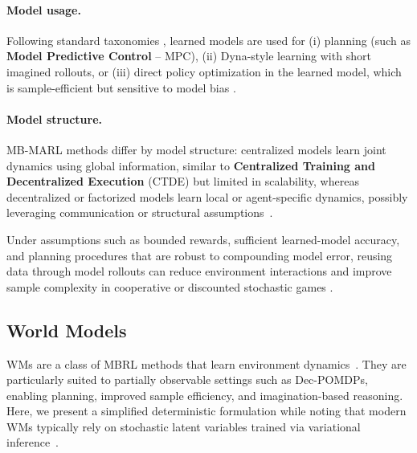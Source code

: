 \documentclass{article}
\theoremstyle{plain}
\theoremstyle{definition}
\theoremstyle{remark}
\begin{document}
\paragraph{Model usage.}
Following standard taxonomies \cite{Moerland2023modelbased,Wang2022modelbasedmultiagentreinforcementlearning},
learned models are used for
(i) planning (such as \textbf{Model Predictive Control} -- MPC),
(ii) Dyna-style learning with short imagined rollouts,
or (iii) direct policy optimization in the learned model,
which is sample-efficient but sensitive to model bias
\cite{Moerland2023modelbased}.

\paragraph{Model structure.}
MB-MARL methods differ by model structure: centralized models learn joint dynamics using global information, similar to \textbf{Centralized Training and Decentralized Execution} (CTDE) but limited in scalability, whereas decentralized or factorized models learn local or agent-specific dynamics, possibly leveraging communication or structural assumptions~\cite{Wang2022modelbasedmultiagentreinforcementlearning}.

Under assumptions such as bounded rewards, sufficient learned-model accuracy, and planning procedures that are robust to compounding model error, reusing data through model rollouts
can reduce environment interactions and improve sample complexity
in cooperative or discounted stochastic games
\cite{Wang2022modelbasedmultiagentreinforcementlearning,Moerland2023modelbased}.




\subsection{World Models}
\label{sec:wm_basics}

WMs are a class of MBRL methods
that learn environment dynamics~\cite{ha2018worldmodels,hafner2020dreamer}.
They are particularly suited to partially observable settings such as Dec-POMDPs,
enabling planning, improved sample efficiency, and imagination-based reasoning.
Here, we present a simplified deterministic formulation while noting that
modern WMs typically rely on stochastic latent variables trained via variational inference~\cite{hafner2019learning,hafner2020dreamer}.
\end{document}
